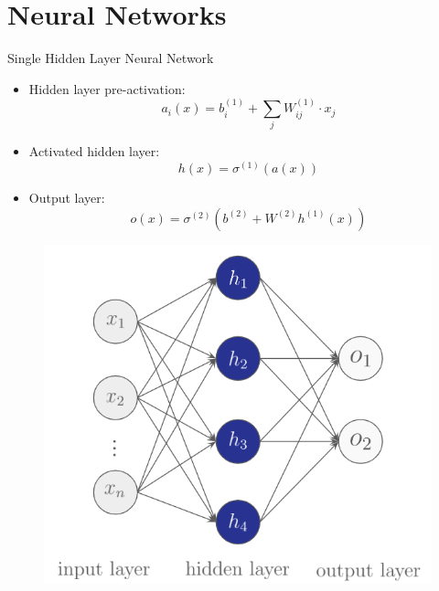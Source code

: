 \documentclass[serif, aspectratio=169]{beamer}
\begin{document}
\section{Neural Networks}
\begin{frame}{Single Hidden Layer Neural Network}
	\begin{itemize}
		\item Hidden layer pre-activation:
		      $$a_i(x) = b^{(1)}_i + \sum_j W^{(1)}_{ij} \cdot x_j$$
		\item Activated hidden layer:
		      $$h(x) = \sigma^{(1)}(a(x))$$
		\item Output layer:
		      $$ o(x) = \sigma^{(2)}\left(b^{(2)} + W^{(2)}h^{(1)}(x) \right) $$
	\end{itemize}
	\endminipage
	\hfill
	\begin{figure}[bh]
		\includegraphics[width=\linewidth]{pic/2/single-hidden_nn.png}
	\end{figure}
	\endminipage
\end{frame}
\end{document}
